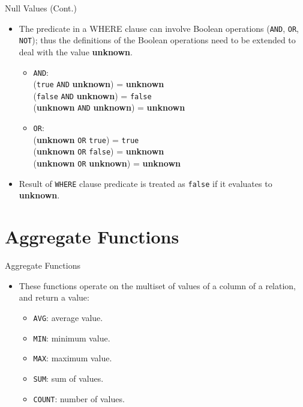 \documentclass{beamer}
\begin{document}
\begin{frame}[fragile]{Null Values (Cont.)}
    \begin{itemize}
        \item The predicate in a WHERE clause can involve Boolean operations (\texttt{AND}, \texttt{OR}, \texttt{NOT}); thus the definitions of the Boolean operations need to be extended to deal with the value \textbf{unknown}. \pause
        \begin{itemize}
            \item \texttt{AND}:\\ 
                (\texttt{true} \texttt{AND} \textbf{unknown}) = \textbf{unknown}\\
                (\texttt{false} \texttt{AND} \textbf{unknown}) = \texttt{false}\\
                (\textbf{unknown} \texttt{AND} \textbf{unknown}) = \textbf{unknown} \pause
            \item \texttt{OR}:\\ 
                (\textbf{unknown} \texttt{OR} \texttt{true}) = \texttt{true}\\
                (\textbf{unknown} \texttt{OR} \texttt{false}) = \textbf{unknown}\\
                (\textbf{unknown} \texttt{OR} \textbf{unknown}) = \textbf{unknown} \pause
        \end{itemize}
        \item Result of \texttt{WHERE} clause predicate is treated as \texttt{false} if it evaluates to \textbf{unknown}.
    \end{itemize}
\end{frame}

\section{Aggregate Functions}

\begin{frame}[fragile]{Aggregate Functions}
    \begin{itemize}
        \item These functions operate on the multiset of values of a column of a relation, and return a value:
        \begin{itemize}
            \item \texttt{AVG}: average value.
            \item \texttt{MIN}: minimum value.
            \item \texttt{MAX}: maximum value.
            \item \texttt{SUM}: sum of values.
            \item \texttt{COUNT}: number of values.
        \end{itemize}
    \end{itemize}
\end{frame}
\end{document}
